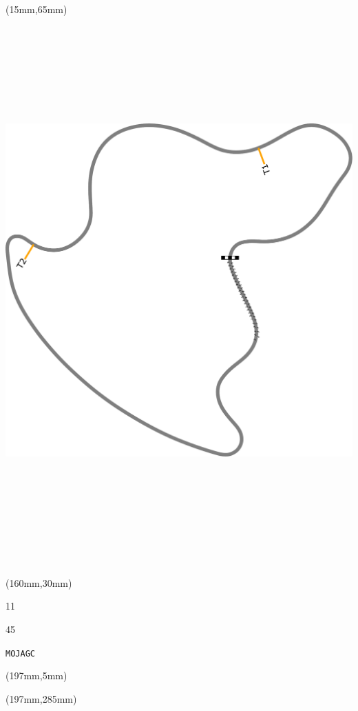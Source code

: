 \begin{textblock*}{185mm}(15mm,65mm)%
\centering
\mbox{\includegraphics[width=185mm,height=210mm,keepaspectratio]{PT/MOJAGC.pdf}}
\end{textblock*}
\begin{textblock*}{40mm}(160mm,30mm)%
\Large
\par{} 
\par11 
\par45 
\par\hfill\tiny\tt MOJAGC\\
\end{textblock*}
\begin{textblock*}{20mm}(197mm,5mm)%
\fbox{\thepage}
\label{MOJAGC}
\end{textblock*}
\begin{textblock*}{20mm}(197mm,285mm)%
\fbox{\thepage}
\end{textblock*}


